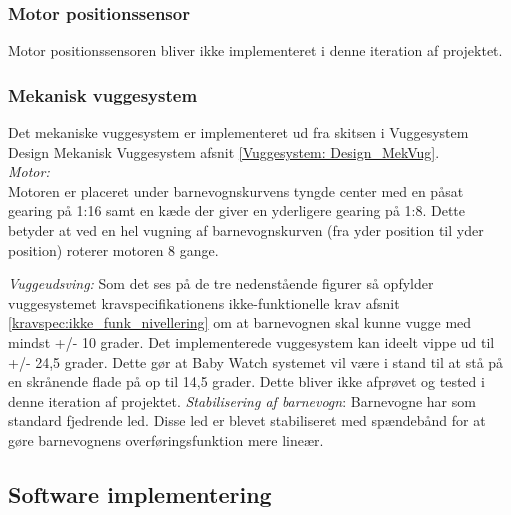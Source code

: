 \subsubsection{Motor positionssensor}
Motor positionssensoren bliver ikke implementeret i denne iteration af projektet.

\newpage
\subsubsection{Mekanisk vuggesystem}
\label{Vuggesystem: Implementering_MV} 
Det mekaniske vuggesystem er implementeret ud fra skitsen i Vuggesystem Design Mekanisk Vuggesystem afsnit \ref{Vuggesystem: Design_MekVug}. \\
\textit{Motor:}\\
Motoren er placeret under barnevognskurvens tyngde center med en påsat gearing på 1:16 samt en kæde der giver en yderligere gearing på 1:8. Dette betyder at ved en hel vugning af barnevognskurven (fra yder position til yder position) roterer motoren 8 gange.

\textit{Vuggeudsving:}
Som det ses på de tre nedenstående figurer så opfylder vuggesystemet kravspecifikationens ikke-funktionelle krav afsnit \ref{kravspec:ikke_funk_nivellering} om at barnevognen skal kunne vugge med mindst +/- 10 grader. Det implementerede vuggesystem  kan ideelt vippe ud til +/- 24,5 grader. Dette gør at Baby Watch systemet vil være i stand til at stå på en skrånende flade på op til 14,5 grader. Dette bliver ikke afprøvet og tested i denne iteration af projektet. 
\textit{Stabilisering af barnevogn}:
Barnevogne har som standard fjedrende led. Disse led er blevet stabiliseret med spændebånd for at gøre barnevognens overføringsfunktion mere lineær. 
\subsection{Software implementering}
